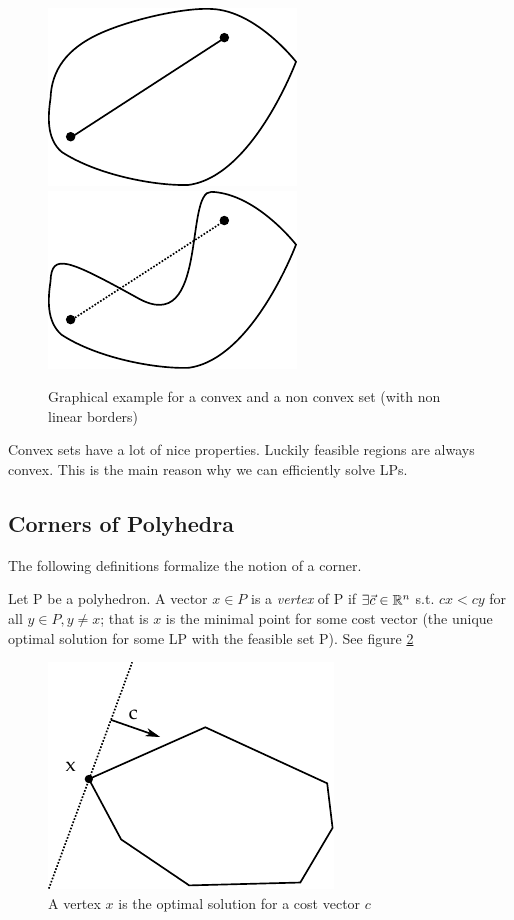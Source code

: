 \begin{figure}[hbt]
\begin{center}
\includegraphics{./images/convex.pdf}\hspace{2cm}
\includegraphics{./images/notConvex.pdf}
\end{center}
\caption{Graphical example for a convex and a non convex set (with non linear borders)}
\label{Fig:convexNotConvex}
\end{figure}

Convex sets have a lot of nice properties. Luckily feasible regions are always convex. This is the main reason why we can efficiently solve LPs. 

\subsection{Corners of Polyhedra}
The following definitions formalize the notion of a corner.

\begin{Def}[Vertex]\label{Def:Vertex} Let P be a polyhedron. A vector $x\in P$ is a \emph{vertex} of P if $\exists \vec c\in \mathbb{R}^n$
 s.t. $cx < cy$ for all $y\in P, y \neq x $; that is $x$ is the minimal point for some cost vector (the unique optimal solution for some LP with the feasible set P). See figure \ref{Fig:vertex}
\end{Def}

\begin{figure}[hbt]
\begin{center}
\includegraphics{./images/vertex.pdf}
\end{center}
\caption{A vertex $x$ is the optimal solution for a cost vector $c$}
\label{Fig:vertex}
\end{figure}

